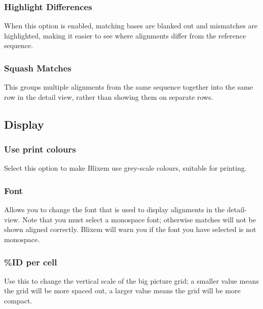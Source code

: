 \documentclass[letterpaper]{article}
\begin{document}
{\color[rgb]{0.30980393,0.5058824,0.7411765}\subsubsection[Highlight Differences]{Highlight Differences}}
\hypertarget{RefHeading2361056909880}{}
When this option is enabled, matching bases are blanked out and mismatches are highlighted, making it easier to see where alignments differ from the reference sequence.

\bigskip

{\color[rgb]{0.30980393,0.5058824,0.7411765}\subsubsection[Squash Matches ]{Squash Matches }}
\hypertarget{RefHeading2381056909880}{}
This groups multiple alignments from the same sequence together into the same row in the detail view, rather than showing them on separate rows.

\bigskip

{\color[rgb]{0.30980393,0.5058824,0.7411765}\subsection[Display]{Display}}
\hypertarget{RefHeading2421056909880}{}
{\color[rgb]{0.30980393,0.5058824,0.7411765}\subsubsection[Use print colours]{Use print colours}}
\hypertarget{RefHeading2641056909880}{}
Select this option to make Blixem use grey-scale colours, suitable for printing.

\bigskip

{\color[rgb]{0.30980393,0.5058824,0.7411765}\subsubsection[Font]{Font}}
\hypertarget{RefHeading2441056909880}{}
Allows you to change the font that is used to display alignments in the detail-view. Note that you must select a monospace font; otherwise matches will not be shown aligned correctly. Blixem will warn you if the font you have selected is not monospace.

\bigskip

{\color[rgb]{0.30980393,0.5058824,0.7411765}\subsubsection[\%ID per cell]{\%ID per cell}}
\hypertarget{RefHeading2561056909880}{}
Use this to change the vertical scale of the big picture grid; a smaller value means the grid will be more spaced out, a larger value means the grid will be more compact.
\end{document}
